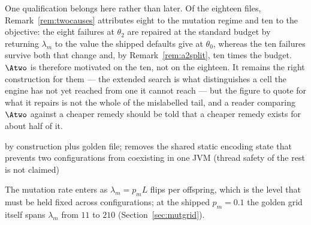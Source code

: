 One qualification belongs here rather than later. Of the eighteen files,
Remark~\ref{rem:twocauses} attributes eight to the mutation regime and ten to the objective:
the eight  failures at $\theta_2$ are repaired at the standard budget by
returning $\lambda_m$ to the value the shipped defaults give at $\theta_0$, whereas the ten
 failures survive both that change and, by
Remark~\ref{rem:a2split}, ten times the budget. $\Atwo$ is therefore motivated on the ten, not
on the eighteen. It remains the right construction for them --- the extended search is what
distinguishes a cell the engine has not yet reached from one it cannot reach --- but the
figure to quote for what it repairs is not the whole of the mislabelled tail, and a reader
comparing $\Atwo$ against a cheaper remedy should be told that a cheaper remedy exists for
about half of it.



by construction plus golden file; removes the shared static encoding state that prevents two configurations from coexisting in one JVM (thread safety of the rest is not claimed)



The mutation rate enters as $\lambda_m=p_mL$ flips per offspring, which is the level that must
be held fixed across configurations; at the shipped $p_m=0.1$ the golden grid itself spans
$\lambda_m$ from $11$ to $210$ (Section~\ref{sec:mutgrid}).



